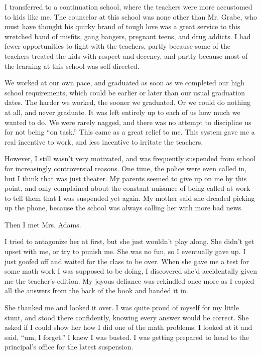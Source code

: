I transferred to a continuation school, where the teachers were more accustomed to kids like me. The counselor at this school was none other than Mr. Grabe, who must have thought his quirky brand of tough love was a great service to this wretched band of misfits, gang bangers, pregnant teens, and drug addicts. I had fewer opportunities to fight with the teachers, partly because some of the teachers treated the kids with respect and decency, and partly because most of the learning at this school was self-directed.

We worked at our own pace, and graduated as soon as we completed our high school requirements, which could be earlier or later than our usual graduation dates. The harder we worked, the sooner we graduated. Or we could do nothing at all, and never graduate. It was left entirely up to each of us how much we wanted to do. We were rarely nagged, and there was no attempt to discipline us for not being ``on task.'' This came as a great relief to me. This system gave me a real incentive to work, and less incentive to irritate the teachers.

However, I still wasn't very motivated, and was frequently suspended from school for increasingly controversial reasons. One time, the police were even called in, but I think that was just theater. My parents seemed to give up on me by this point, and only complained about the constant nuisance of being called at work to tell them that I was suspended yet again. My mother said she dreaded picking up the phone, because the school was always calling her with more bad news.

Then I met Mrs. Adams.

I tried to antagonize her at first, but she just wouldn't play along. She didn't get upset with me, or try to punish me. She was no fun, so I eventually gave up. I just goofed off and waited for the class to be over. When she gave me a test for some math work I was supposed to be doing, I discovered she'd accidentally given me the teacher's edition. My joyous defiance was rekindled once more as I copied all the answers from the back of the book and handed it in.

She thanked me and looked it over. I was quite proud of myself for my little stunt, and stood there confidently, knowing every answer would be correct. She asked if I could show her how I did one of the math problems. I looked at it and said, ``um, I forget.'' I knew I was busted. I was getting prepared to head to the principal's office for the latest suspension.

